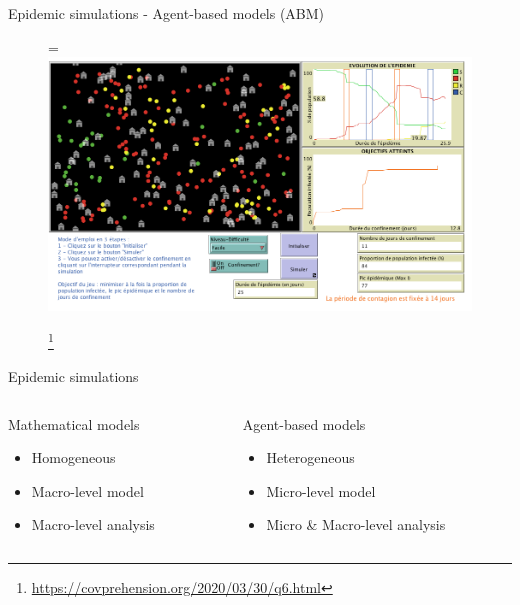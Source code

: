 \documentclass{beamer}
\newcommand{\vcenteredhbox}[1]{\begingroup
\setbox0=\hbox{#1}\parbox{\wd0}{\box0}\endgroup}
\begin{document}
\begin{frame}{Epidemic simulations - Agent-based models (ABM)}
    \begin{figure}[htpb]
        \begin{center}
            \vcenteredhbox{\includegraphics[width=0.8\linewidth]{fig/abm_covprehension_q6.png}}
            \footnote{{\tiny \url{https://covprehension.org/2020/03/30/q6.html}}}
        \end{center}
    \end{figure}
\end{frame}

\begin{frame}{Epidemic simulations}
    \begin{columns}
        \begin{column}{0.5\textwidth}
            Mathematical models
            \begin{itemize}
                \item Homogeneous
                \item Macro-level model
                \item Macro-level analysis
            \end{itemize}
        \end{column}
        \begin{column}{0.5\textwidth}
            Agent-based models
            \begin{itemize}
                \item Heterogeneous
                \item Micro-level model
                \item Micro \& Macro-level analysis
            \end{itemize}
        \end{column}
    \end{columns}
\end{frame}
\end{document}
